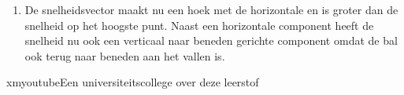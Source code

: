 \documentclass{ximera}
\begin{document}
\begin{denkvraag*}{}
\begin{oplossing}
\begin{enumerate}
        \item De snelheidsvector maakt nu een hoek met de horizontale en is groter dan de snelheid op het hoogste punt. Naast een horizontale component heeft de snelheid nu ook een verticaal naar beneden gerichte component omdat de bal ook terug naar beneden aan het vallen is.
    \end{enumerate}
\end{oplossing}
\end{denkvraag*} \nl

\begin{expandable}{xmyoutube}{Een universiteitscollege over deze leerstof}
\end{expandable}



\end{document}

